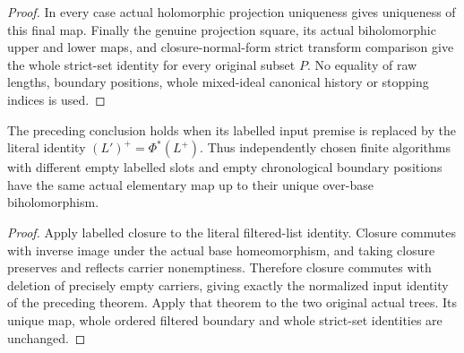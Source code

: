 \begin{proof}
In every case actual holomorphic projection uniqueness gives uniqueness
of this final map. Finally the genuine projection square, its actual
biholomorphic upper and lower maps, and closure-normal-form strict
transform comparison give the whole strict-set identity for every
original subset $P$. No equality of raw lengths, boundary positions,
whole mixed-ideal canonical history or stopping indices is used.
\end{proof}

\begin{corollary}
\label{hir:original-canonical-ordered-filtered-choice}
\leanok
The preceding conclusion holds when its labelled input premise is
replaced by the literal identity $(L')^+=\Phi^*(L^+)$. Thus independently
chosen finite algorithms with different empty labelled slots and empty
chronological boundary positions have the same actual elementary map
up to their unique over-base biholomorphism.
\end{corollary}
\begin{proof}
Apply labelled closure to the literal filtered-list identity. Closure
commutes with inverse image under the actual base homeomorphism, and
taking closure preserves and reflects carrier nonemptiness. Therefore
closure commutes with deletion of precisely empty carriers, giving
exactly the normalized input identity of the preceding theorem.
Apply that theorem to the two original actual trees. Its unique map,
whole ordered filtered boundary and whole strict-set identities are
unchanged.
\end{proof}
